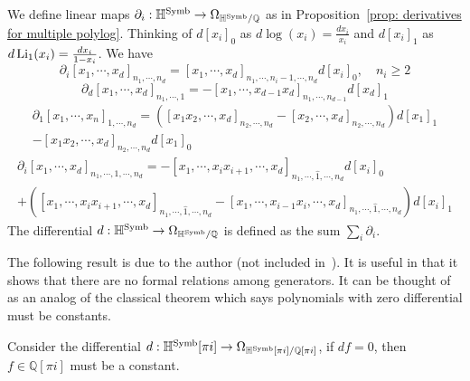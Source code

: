 \begin{definition}
We define linear maps $\partial_i:\mathbb H^{\operatorname{Symb}}\to\Omega_{\mathbb H^{\operatorname{Symb}}/\mathbb Q}$ as in Proposition~\ref{prop: derivatives for multiple polylog}. Thinking of $d[x_i]_0$ as $d\log(x_i)=\frac{dx_i}{x_i}$ and $d[x_i]_1$ as $d\operatorname{Li}_1(x_i)=\frac{dx_i}{1-x_i}$. We have
\begin{equation}
\partial_i[x_1,\cdots,x_d]_{n_1,\cdots,n_d}=[x_1,\cdots,x_d]_{n_1,\cdots,n_i-1,\cdots,n_d}d[x_i]_0,\quad n_i\geq2
\end{equation}
\begin{equation}
\partial_d[x_1,\cdots,x_d]_{n_1,\cdots,1}=-[x_1,\cdots,x_{d-1}x_d]_{n_1,\cdots,n_{d-1}}d[x_d]_1
\end{equation}
\begin{multline}
\partial_1[x_1,\cdots,x_n]_{1,\cdots,n_d}=([x_1x_2,\cdots,x_d]_{n_2,\cdots,n_d}-[x_2,\cdots,x_d]_{n_2,\cdots,n_d})d[x_1]_1\\
-[x_1x_2,\cdots,x_d]_{n_2,\cdots,n_d}d[x_1]_0
\end{multline}
\begin{multline}
\partial_i[x_1,\cdots,x_d]_{n_1,\cdots,1,\cdots,n_d}=-[x_1,\cdots,x_ix_{i+1},\cdots,x_d]_{n_1,\cdots,\widehat{1},\cdots,n_d}d[x_i]_0\\+([x_1,\cdots,x_ix_{i+1},\cdots,x_d]_{n_1,\cdots,\widehat{1},\cdots,n_d}-[x_1,\cdots,x_{i-1}x_i,\cdots,x_d]_{n_1,\cdots,\widehat{1},\cdots,n_d})d[x_i]_1
\end{multline}
The differential $d:\mathbb H^{\operatorname{Symb}}\to\Omega_{\mathbb H^{\operatorname{Symb}}/\mathbb Q}$ is defined as the sum $\sum_i\partial_i$.
\end{definition}

The following result is due to the author (not included in~\cite{ZDHZ_HopfAlgebrasOfMultiplePolylogarithmsAndHolomorphicOneForms}). It is useful in that it shows that there are no formal relations among generators. It can be thought of as an analog of the classical theorem which says polynomials with zero differential must be constants.

\begin{lemma}\label{lem: df=0 => f=const}
Consider the differential $d:\mathbb H^{\operatorname{Symb}}[\pi i]\to\Omega_{\mathbb H^{\operatorname{Symb}}[\pi i]/\mathbb Q[\pi i]}$, if $df=0$, then $f\in\mathbb Q[\pi i]$ must be a constant.
\end{lemma}


